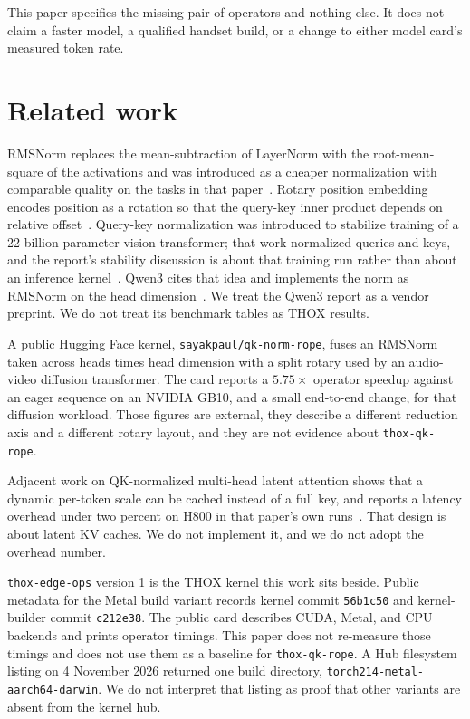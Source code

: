 \documentclass[11pt]{article}
\begin{document}
This paper specifies the missing pair of operators and nothing else.
It does not claim a faster model, a qualified handset build, or a
change to either model card's measured token rate.

\section{Related work}

RMSNorm replaces the mean-subtraction of LayerNorm with the
root-mean-square of the activations and was introduced as a cheaper
normalization with comparable quality on the tasks in that
paper~\cite{rmsnorm}. Rotary position embedding encodes position as a
rotation so that the query-key inner product depends on relative
offset~\cite{rope}. Query-key normalization was introduced to stabilize
training of a 22-billion-parameter vision transformer; that work
normalized queries and keys, and the report's stability discussion is
about that training run rather than about an inference
kernel~\cite{vit22b}. Qwen3 cites that idea and implements the norm as
RMSNorm on the head dimension~\cite{qwen3}. We treat the Qwen3 report
as a vendor preprint. We do not treat its benchmark tables as THOX
results.

A public Hugging Face kernel, \texttt{sayakpaul/qk-norm-rope}, fuses an
RMSNorm taken across heads times head dimension with a split rotary
used by an audio-video diffusion transformer. The card reports a
\(5.75\times\) operator speedup against an eager sequence on an NVIDIA
GB10, and a small end-to-end change, for that diffusion workload. Those
figures are external, they describe a different reduction axis and a
different rotary layout, and they are not evidence about
\texttt{thox-qk-rope}.

Adjacent work on QK-normalized multi-head latent attention shows that a
dynamic per-token scale can be cached instead of a full key, and
reports a latency overhead under two percent on H800 in that paper's
own  runs~\cite{qkmla}. That design is about latent KV caches. We do
not implement it, and we do not adopt the overhead number.

\texttt{thox-edge-ops} version 1 is the THOX kernel this work sits
beside. Public metadata for the Metal build variant records kernel
commit \texttt{56b1c50} and kernel-builder commit \texttt{c212e38}.
The public card describes CUDA, Metal, and CPU backends and prints
operator timings. This paper does not re-measure those timings and does
not use them as a baseline for \texttt{thox-qk-rope}. A Hub filesystem
listing on 4 November 2026 returned one build directory,
\texttt{torch214-metal-aarch64-darwin}. We do not interpret that
listing as proof that other variants are absent from the kernel hub.
\end{document}
